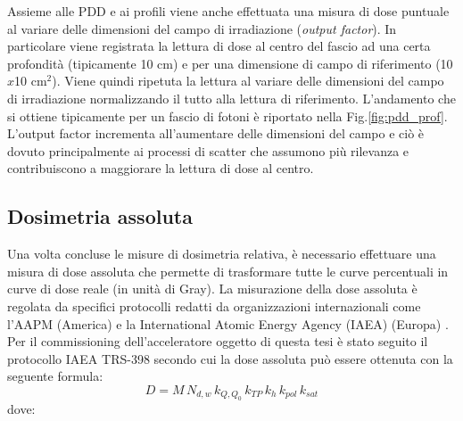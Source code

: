 Assieme alle PDD e ai profili viene anche effettuata una misura di dose puntuale al variare delle dimensioni del campo di irradiazione (\textit{output factor}). In particolare viene registrata la lettura di dose al centro del fascio ad una certa profondità (tipicamente 10 cm) e per una dimensione di campo di riferimento (10$x$10 cm$^2$). Viene quindi ripetuta la lettura al variare delle dimensioni del campo di irradiazione normalizzando il tutto alla lettura di riferimento. L'andamento che si ottiene tipicamente per un fascio di fotoni è riportato nella Fig.\ref{fig:pdd_prof}. L'output factor incrementa all'aumentare delle dimensioni del campo e ciò è dovuto principalmente ai processi di scatter che assumono più rilevanza e contribuiscono a maggiorare la lettura di dose al centro.

\subsection{Dosimetria assoluta}
\label{sec:dose_ass}
Una volta concluse le misure di dosimetria relativa, è necessario effettuare una misura di dose assoluta che permette di trasformare tutte le curve percentuali in curve di dose reale (in unità di Gray). La misurazione della dose assoluta è regolata da specifici protocolli redatti da organizzazioni internazionali come l'AAPM (America) \cite{Almond1999} e la International Atomic Energy Agency (IAEA) (Europa) \cite{Andreo2006}.\\
Per il commissioning dell'acceleratore oggetto di questa tesi è stato seguito il protocollo IAEA TRS-398 secondo cui la dose assoluta può essere ottenuta con la seguente formula:
\begin{equation}
D = M\,N_{d,w}\,k_{Q,Q_0}\,k_{TP}\,k_h\,k_{pol}\,k_{sat}
\end{equation}
dove:

